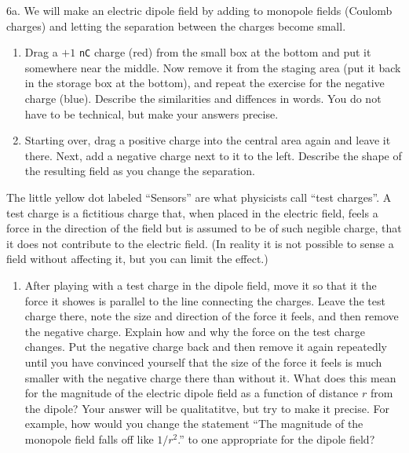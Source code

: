 \documentclass[11pt]{article}
\providecommand{\tightlist}{%
      \setlength{\itemsep}{0pt}\setlength{\parskip}{0pt}}
\begin{document}
6a. We will make an electric dipole field by adding to monopole fields
(Coulomb charges) and letting the separation between the charges become
small.

\begin{enumerate}
\def\labelenumi{\roman{enumi}.}
\item
  Drag a \(+1\) \texttt{nC} charge (red) from the small box at the
  bottom and put it somewhere near the middle. Now remove it from the
  staging area (put it back in the storage box at the bottom), and
  repeat the exercise for the negative charge (blue). Describe the
  similarities and diffences in words. You do not have to be technical,
  but make your answers precise.
\item
  Starting over, drag a positive charge into the central area again and
  leave it there. Next, add a negative charge next to it to the left.
  Describe the shape of the resulting field as you change the
  separation.
\end{enumerate}

The little yellow dot labeled ``Sensors'' are what physicists call
``test charges''. A test charge is a fictitious charge that, when placed
in the electric field, feels a force in the direction of the field but
is assumed to be of such negible charge, that it does not contribute to
the electric field. (In reality it is not possible to sense a field
without affecting it, but you can limit the effect.)

\begin{enumerate}
\def\labelenumi{\roman{enumi}.}
\setcounter{enumi}{2}
\tightlist
\item
  After playing with a test charge in the dipole field, move it so that
  it the force it showes is parallel to the line connecting the charges.
  Leave the test charge there, note the size and direction of the force
  it feels, and then remove the negative charge. Explain how and why the
  force on the test charge changes. Put the negative charge back and
  then remove it again repeatedly until you have convinced yourself that
  the size of the force it feels is much smaller with the negative
  charge there than without it. What does this mean for the magnitude of
  the electric dipole field as a function of distance \(r\) from the
  dipole? Your answer will be qualitatitve, but try to make it precise.
  For example, how would you change the statement ``The magnitude of the
  monopole field falls off like \(1/r^2\).'' to one appropriate for the
  dipole field?
\end{enumerate}
 
\end{document}
